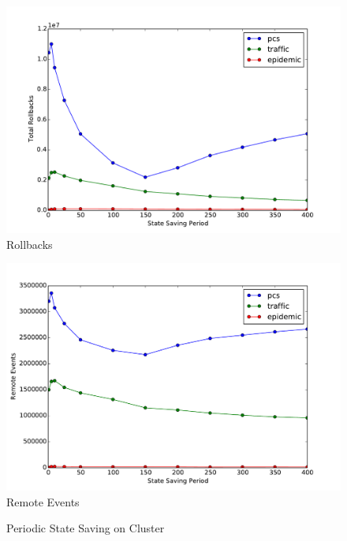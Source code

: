 \documentclass[11pt]{book}
\begin{document}
\begin{figure}
  \begin{minipage}{.5\textwidth}
    \begin{center}
      \includegraphics[width=\textwidth,keepaspectratio,quiet]{figs/state_saving/beowulf/rollbacks.pdf} \\
      Rollbacks \\
    \end{center}
  \end{minipage}%
  \hfill
  \begin{minipage}{.5\textwidth}
    \begin{center}
      \includegraphics[width=\textwidth,keepaspectratio,quiet]{figs/state_saving/beowulf/remote_events.pdf} \\
      Remote Events \\
    \end{center}
  \end{minipage}
  \caption{Periodic State Saving on Cluster}\label{ssp_analysis_cluster1}
\end{figure}
\end{document}
